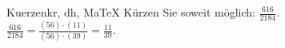 \begin{MAufgabe}{Kuerzen}{kr, dh, MaTeX}
K\"urzen Sie soweit m\"oglich: $\frac{616}{2184}$.\\ 
\ifLsg\MLoesung
\quad $\frac{616}{2184}=\frac{(56)\cdot(11)}{(56)\cdot(39)}=\frac{11}{39}$.\else\relax\fi
 \end{MAufgabe}